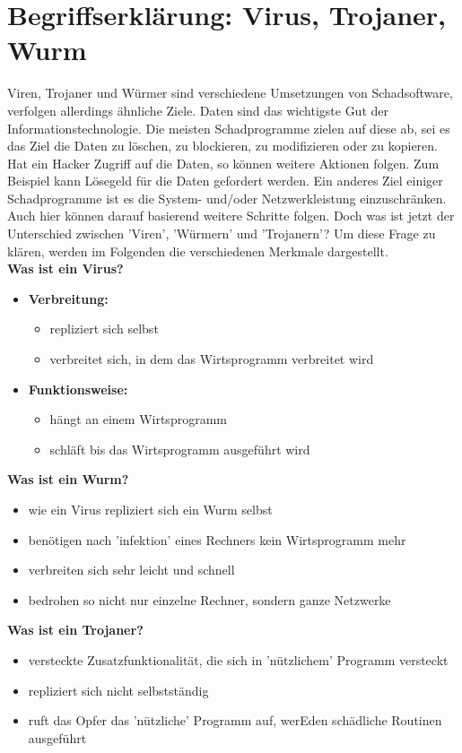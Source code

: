 \section{Begriffserklärung: Virus, Trojaner, Wurm}\label{sec:abgrenzung}
Viren, Trojaner und Würmer sind verschiedene Umsetzungen von Schadsoftware,
verfolgen allerdings ähnliche Ziele. Daten sind das wichtigste Gut der
Informationstechnologie. Die meisten Schadprogramme zielen auf diese ab, sei es
das Ziel die Daten zu löschen, zu blockieren, zu modifizieren oder zu kopieren.
Hat ein Hacker Zugriff auf die Daten, so können weitere Aktionen folgen.
Zum Beispiel kann Lösegeld für die Daten gefordert werden.
Ein anderes Ziel einiger Schadprogramme ist es die System- und/oder Netzwerkleistung
einzuschränken. Auch hier können darauf basierend weitere Schritte folgen.
Doch was ist jetzt der Unterschied zwischen 'Viren', 'Würmern' und 'Trojanern'?
Um diese Frage zu klären, werden im Folgenden die verschiedenen Merkmale dargestellt.
\cite{KASTRO}\\

\textbf{Was ist ein Virus?}
\begin{itemize}
    \item \textbf{Verbreitung: } 
        \begin{itemize}
            \item repliziert sich selbst
            \item verbreitet sich, in dem das Wirtsprogramm verbreitet wird
        \end{itemize}
    \item \textbf{Funktionsweise: } 
        \begin{itemize}
            \item hängt an einem Wirtsprogramm
            \item schläft bis das Wirtsprogramm ausgeführt wird
        \end{itemize}
\end{itemize}

\textbf{Was ist ein Wurm?}
\begin{itemize}
    \item wie ein Virus repliziert sich ein Wurm selbst
    \item benötigen nach 'infektion' eines Rechners kein Wirtsprogramm mehr
    \item verbreiten sich sehr leicht und schnell
    \item bedrohen so nicht nur einzelne Rechner, sondern ganze Netzwerke
\end{itemize}

\textbf{Was ist ein Trojaner?}
\begin{itemize}
    \item versteckte Zusatzfunktionalität, die sich in 'nützlichem' Programm versteckt
    \item repliziert sich nicht selbstständig
    \item ruft das Opfer das 'nützliche' Programm auf, werEden schädliche Routinen ausgeführt
\end{itemize}
\cite{ABGVT}